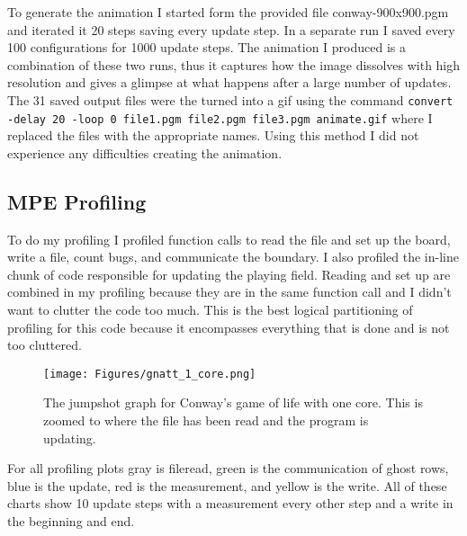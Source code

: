 \documentclass[11pt,a4paper,oneside]{report}
\begin{document}
To generate the animation I started form the provided file conway-900x900.pgm and iterated it 20 steps saving every update step.  
In a separate run I saved every 100 configurations for 1000 update steps.
The animation I produced is a combination of these two runs, thus it captures how the image dissolves with high resolution and gives a glimpse at what happens after a large number of updates.
The 31 saved output files were the turned into a gif using the command \texttt{convert -delay 20 -loop 0 file1.pgm file2.pgm file3.pgm animate.gif} where I replaced the files with the appropriate names.
Using this method I did not experience any difficulties creating the animation.



\subsection{MPE Profiling}
To do my profiling I profiled function calls to read the file and set up the board, write a file, count bugs, and communicate the boundary.
I also profiled the in-line chunk of code responsible for updating the playing field.
Reading and set up are combined in my profiling because they are in the same function call and I didn't want to clutter the code too much.
This is the best logical partitioning of profiling for this code because it encompasses everything that is done and is not too cluttered.

\begin{figure}[htpb]
  \centering
  \texttt{[image: Figures/gnatt\_1\_core.png]}
  \caption{The jumpshot graph for Conway's game of life with one core.  This is zoomed to where the file has been read and the program is updating.}
  \label{fig:onecore}
\end{figure}

For all profiling plots {\color{gray} gray} is {\color{gray} fileread}, {\color{green} green} is the {\color{green}communication of ghost rows}, {\color{blue} blue} is the {\color{blue} update}, {\color{red} red} is the {\color{red} measurement}, and {\color{yellow}yellow} is the {\color{yellow} write}.  All of these charts show 10 update steps with a measurement every other step and a write in the beginning and end.
\end{document}
